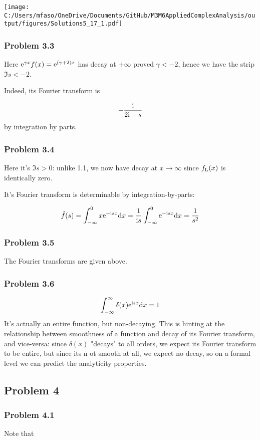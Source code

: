 \documentclass[12pt,landscape]{article}
\def\D{ {\rm d} }
\def\I{ {\rm i} }
\def\E{ {\rm e} }
\def\dx{\D x}
\begin{document}
{\texttt{[image: C:/Users/mfaso/OneDrive/Documents/GitHub/M3M6AppliedComplexAnalysis/output/figures/Solutions5\_17\_1.pdf]}

\subsubsection{Problem 3.3}
Here $\E^{\gamma x } f(x) = \E^{(\gamma+2) x}$ has decay at $+\infty$ proved $\gamma < -2$, hence we have the strip $\Im s < -2$.

Indeed, its Fourier transform is

\[
-{\I \over 2 \I +s}
\]
by integration by parts.

\subsubsection{Problem 3.4}
Here it's $\Im s > 0$: unlike 1.1, we now have decay at $x \rightarrow \infty$ since $f_{\rm L}(x)$ is identically zero.

It's Fourier transform is determinable by integration-by-parts:

\[
\hat f(s) = \int_{-\infty}^0 x \E^{-\I s x} \dx = {1 \over \I s} \int_{-\infty}^0\E^{-\I s x} \dx = {1 \over s^2}
\]
\subsubsection{Problem 3.5}
The Fourier transforms are given above.

\subsubsection{Problem 3.6}
\[
\int_{-\infty}^\infty \delta(x) \E^{\I s x} \dx = 1
\]
It's actually an entire function, but non-decaying. This is hinting at the relationship between smoothness of a function and decay of its Fourier transform, and vice-versa: since $\delta(x)$ "decays" to all orders, we expect its Fourier transform to be entire, but since its n ot smooth at all, we expect no decay, so on a formal level we can predict the analyticity properties.

\subsection{Problem 4}
\subsubsection{Problem 4.1}
Note that

}
\end{document}
